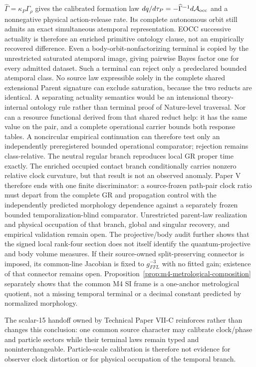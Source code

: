 \documentclass[11pt]{article}
\begin{document}
\(\widehat\Gamma=\kappa_P\Gamma_\rho\) gives the calibrated formation law
\(dq/d\tau_P=-\widehat\Gamma^{-1}d\mathcal A_{\rm occ}\) and a nonnegative
physical action-release rate.  Its complete autonomous orbit still admits an
exact simultaneous atemporal representation.  EOCC successive actuality is
therefore an enriched primitive ontology clause, not an empirically recovered
difference.  Even a body-orbit-nonfactorizing terminal is copied by the
unrestricted saturated atemporal image, giving pairwise Bayes factor one for
every admitted dataset.  Such a terminal can reject only a predeclared
bounded atemporal class.  No source law expressible solely in the complete
shared extensional Parent signature can exclude saturation, because the two
reducts are identical.  A separating actuality semantics would be an
intensional theory-internal ontology rule rather than terminal proof of
Nature-level traversal.  Nor can a resource functional derived from that
shared reduct help: it has the same value on the pair, and a complete
operational carrier bounds both response tables.  A noncircular empirical
continuation can therefore test only an independently preregistered bounded
operational comparator; rejection remains class-relative.
The neutral regular branch reproduces local GR proper time exactly. The
enriched occupied contact branch conditionally carries nonzero relative clock
curvature, but that result is not an observed anomaly. Paper V therefore ends
with one finite discriminator: a source-frozen path-pair clock ratio must
depart from the complete GR and propagation control with the independently
predicted morphology dependence against a separately frozen bounded
temporalization-blind comparator. Unrestricted parent-law realization and
physical occupation of that branch, global and singular recovery, and
empirical validation remain open.
The projective/body audit further shows that the signed local rank-four section
does not itself identify the quantum-projective and body volume measures.  If
their source-owned split-preserving connector is imposed, its common-line
Jacobian is fixed to $g_{FFL}^{-3}$ with no fitted gain; existence of that
connector remains open. Proposition~\ref{prop:m4-metrological-composition}
separately shows that the common M4 SI frame is a one-anchor metrological
quotient, not a missing temporal terminal or a decimal constant predicted by
normalized morphology.

The scalar-15 handoff owned by Technical Paper VII-C reinforces rather than
changes this conclusion: one common source character may calibrate clock/phase
and particle sectors while their terminal laws remain typed and
noninterchangeable. Particle-scale calibration is therefore not evidence for
observer clock distortion or for physical occupation of the temporal branch.




\end{document}
